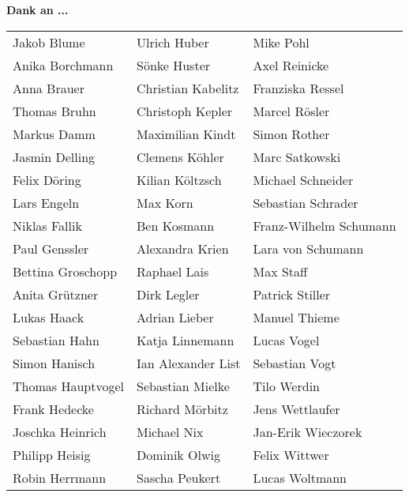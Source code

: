 \textbf{Dank an ...}
\\

\begin{tabular}{l l l} 

Jakob Blume & Ulrich Huber & Mike Pohl\\
Anika Borchmann & Sönke Huster & Axel Reinicke\\
Anna Brauer & Christian Kabelitz & Franziska Ressel\\
Thomas Bruhn & Christoph Kepler& Marcel Rösler\\
Markus Damm & Maximilian Kindt & Simon Rother\\
Jasmin Delling & Clemens Köhler & Marc Satkowski\\
Felix Döring & Kilian Költzsch & Michael Schneider\\
Lars Engeln & Max Korn & Sebastian Schrader\\
Niklas Fallik & Ben Kosmann & Franz-Wilhelm Schumann\\
Paul Genssler & Alexandra Krien & Lara von Schumann\\
Bettina Groschopp & Raphael Lais & Max Staff\\
Anita Grützner & Dirk Legler & Patrick Stiller\\
Lukas Haack & Adrian Lieber & Manuel Thieme\\
Sebastian Hahn & Katja Linnemann & Lucas Vogel\\
Simon Hanisch & Ian Alexander List & Sebastian Vogt\\
Thomas Hauptvogel & Sebastian Mielke & Tilo Werdin\\
Frank Hedecke & Richard Mörbitz & Jens Wettlaufer\\
Joschka Heinrich & Michael Nix & Jan-Erik Wieczorek\\
Philipp Heisig & Dominik Olwig & Felix Wittwer\\
Robin Herrmann & Sascha Peukert & Lucas Woltmann\\

\end{tabular}

